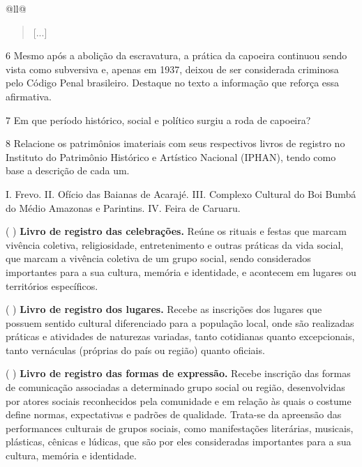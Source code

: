 \begin{itemize}
\begin{itemize}
\begin{escolha}[]{@{}ll@{}}
\begin{quote}
{[}...{]}

\end{quote}

\num{6} Mesmo após a abolição da escravatura, a prática da capoeira continuou
  sendo vista como subversiva e, apenas em 1937, deixou de ser considerada
  criminosa pelo Código Penal brasileiro. Destaque no texto a informação
  que reforça essa afirmativa.


\num{7} Em que período histórico, social e político surgiu a roda de
  capoeira?


\num{8} Relacione os patrimônios imateriais com seus respectivos livros de
  registro no Instituto do Patrimônio Histórico e Artístico Nacional
  (IPHAN), tendo como base a descrição de cada um.

I. Frevo.
II. Ofício das Baianas de Acarajé.
III. Complexo Cultural do Boi Bumbá do Médio Amazonas e Parintins.
IV. Feira de Caruaru.

(  ) \textbf{Livro de registro das celebrações.} Reúne os rituais e
festas que marcam vivência coletiva, religiosidade, entretenimento e
outras práticas da vida social, que marcam a vivência coletiva de um
grupo social, sendo considerados importantes para a sua cultura, memória
e identidade, e acontecem em lugares ou territórios específicos.

(  ) \textbf{Livro de registro dos lugares.} Recebe as inscrições dos
lugares que possuem sentido cultural diferenciado para a população
local, onde são realizadas práticas e atividades de naturezas variadas,
tanto cotidianas quanto excepcionais, tanto vernáculas (próprias do país
ou região) quanto oficiais.

(  ) \textbf{Livro de registro das formas de expressão.} Recebe 
inscrição das formas de comunicação associadas a determinado grupo
social ou região, desenvolvidas por atores sociais reconhecidos pela
comunidade e em relação às quais o costume define normas, expectativas e
padrões de qualidade. Trata-se da apreensão das performances culturais
de grupos sociais, como manifestações literárias, musicais, plásticas,
cênicas e lúdicas, que são por eles consideradas importantes para a sua
cultura, memória e identidade.


\end{escolha}
\end{itemize}
\end{itemize}

